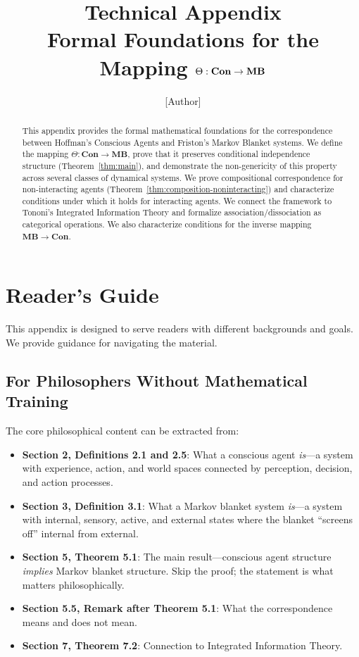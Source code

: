 \documentclass[11pt,a4paper]{article}
\title{\textbf{Technical Appendix}\\[0.5em]
\large Formal Foundations for the Mapping $\Theta: \Con \to \MB$}
\author{[Author]}
\date{}
\theoremstyle{definition}
\theoremstyle{plain}
\theoremstyle{remark}
\newcommand{\Con}{\mathbf{Con}}
\newcommand{\MB}{\mathbf{MB}}
\begin{document}
\maketitle

\begin{abstract}
This appendix provides the formal mathematical foundations for the correspondence between Hoffman's Conscious Agents and Friston's Markov Blanket systems. We define the mapping $\Theta: \Con \to \MB$, prove that it preserves conditional independence structure (Theorem~\ref{thm:main}), and demonstrate the non-genericity of this property across several classes of dynamical systems. We prove compositional correspondence for non-interacting agents (Theorem~\ref{thm:composition-noninteracting}) and characterize conditions under which it holds for interacting agents. We connect the framework to Tononi's Integrated Information Theory and formalize association/dissociation as categorical operations. We also characterize conditions for the inverse mapping $\MB \to \Con$.
\end{abstract}

\tableofcontents

\newpage

\section*{Reader's Guide}

This appendix is designed to serve readers with different backgrounds and goals. We provide guidance for navigating the material.

\subsection*{For Philosophers Without Mathematical Training}

The core philosophical content can be extracted from:
\begin{itemize}
    \item \textbf{Section 2, Definitions 2.1 and 2.5}: What a conscious agent \emph{is}---a system with experience, action, and world spaces connected by perception, decision, and action processes.
    \item \textbf{Section 3, Definition 3.1}: What a Markov blanket system \emph{is}---a system with internal, sensory, active, and external states where the blanket ``screens off'' internal from external.
    \item \textbf{Section 5, Theorem 5.1}: The main result---conscious agent structure \emph{implies} Markov blanket structure. Skip the proof; the statement is what matters philosophically.
    \item \textbf{Section 5.5, Remark after Theorem 5.1}: What the correspondence means and does not mean.
    \item \textbf{Section 7, Theorem 7.2}: Connection to Integrated Information Theory.
\end{itemize}
\end{document}
